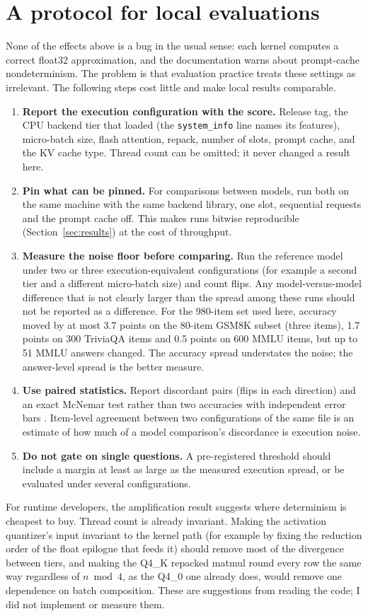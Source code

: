 \section{A protocol for local evaluations}
\label{sec:recommend}

None of the effects above is a bug in the usual sense: each kernel computes a correct float32
approximation, and the documentation warns about prompt-cache nondeterminism. The problem is
that evaluation practice treats these settings as irrelevant. The following steps cost little
and make local results comparable.

\begin{enumerate}
\item \textbf{Report the execution configuration with the score.} Release tag, the CPU backend
tier that loaded (the \texttt{system\_info} line names its features), micro-batch size, flash
attention, repack, number of slots, prompt cache, and the KV cache type. Thread count can be
omitted; it never changed a result here.
\item \textbf{Pin what can be pinned.} For comparisons between models, run both on the same
machine with the same backend library, one slot, sequential requests and the prompt cache off.
This makes runs bitwise reproducible (Section~\ref{sec:results}) at the cost of throughput.
\item \textbf{Measure the noise floor before comparing.} Run the reference model under two or
three execution-equivalent configurations (for example a second tier and a different micro-batch
size) and count flips. Any model-versus-model difference that is not clearly larger than the
spread among these runs should not be reported as a difference. For the 980-item set used here,
accuracy moved by at most 3.7 points on the 80-item GSM8K subset (three items), 1.7 points on
300 TriviaQA items and 0.5 points on 600 MMLU items, but up to 51 MMLU answers changed. The accuracy spread understates the noise;
the answer-level spread is the better measure.
\item \textbf{Use paired statistics.} Report discordant pairs (flips in each direction) and an
exact McNemar test rather than two accuracies with independent error bars \citep{miller2024}.
Item-level agreement between two configurations of the same file is an estimate of how
much of a model comparison's discordance is execution noise.
\item \textbf{Do not gate on single questions.} A pre-registered threshold should include a
margin at least as large as the measured execution spread, or be evaluated under several
configurations.
\end{enumerate}

For runtime developers, the amplification result suggests where determinism is cheapest to buy.
Thread count is already invariant. Making the activation quantizer's input invariant to the
kernel path (for example by fixing the reduction order of the float epilogue that feeds it)
should remove most of the divergence between tiers, and making the Q4\_K repacked matmul round every row the same way regardless of $n \bmod 4$,
as the Q4\_0 one already does, would remove one dependence on batch composition. These are
suggestions from reading the code; I did not implement or measure them.
